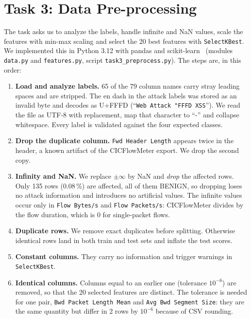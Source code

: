\chapter{Task 3: Data Pre-processing}\label{chap:task3_preprocessing}

The task asks us to analyze the labels, handle infinite and NaN values, scale the features with min-max scaling and select the 20 best features with \texttt{SelectKBest}. We implemented this in Python 3.12 with pandas and scikit-learn~\cite{pedregosa2011sklearn} (modules \texttt{data.py} and \texttt{features.py}, script \texttt{task3\_preprocess.py}). The steps are, in this order:

\begin{enumerate}\setlength\itemsep{0pt}
	\item \textbf{Load and analyze labels.} 65 of the 79 column names carry stray leading spaces and are stripped. The en dash in the attack labels was stored as an invalid byte and decodes as U+FFFD (``\texttt{Web Attack \char"FFFD{} XSS}''). We read the file as UTF-8 with replacement, map that character to ``-'' and collapse whitespace. Every label is validated against the four expected classes.
	\item \textbf{Drop the duplicate column.} \texttt{Fwd Header Length} appears twice in the header, a known artifact of the CICFlowMeter export. We drop the second copy.
	\item \textbf{Infinity and NaN.} We replace $\pm\infty$ by NaN and \emph{drop} the affected rows. Only 135 rows (0.08\,\%) are affected, all of them BENIGN, so dropping loses no attack information and introduces no artificial values. The infinite values occur only in \texttt{Flow Bytes/s} and \texttt{Flow Packets/s}: CICFlowMeter divides by the flow duration, which is 0 for single-packet flows.
	\item \textbf{Duplicate rows.} We remove exact duplicates before splitting. Otherwise identical rows land in both train and test sets and inflate the test scores.
	\item \textbf{Constant columns.} They carry no information and trigger warnings in \texttt{SelectKBest}.
	\item \textbf{Identical columns.} Columns equal to an earlier one (tolerance $10^{-6}$) are removed, so that the 20 selected features are distinct. The tolerance is needed for one pair, \texttt{Bwd Packet Length Mean} and \texttt{Avg Bwd Segment Size}: they are the same quantity but differ in 2 rows by $10^{-6}$ because of CSV rounding.

\end{enumerate}
